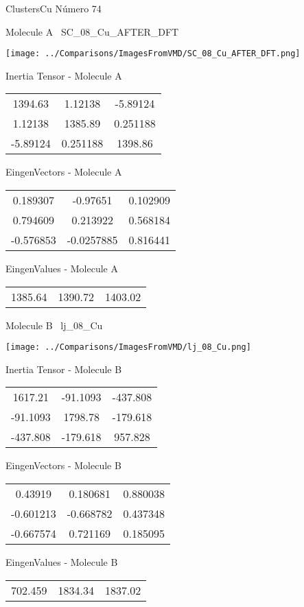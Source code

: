 \vtab[-3cm]
\begin{center}
{\large ClustersCu \tab Número 74}
\end{center}
\begin{multicols}{2}
\begin{center}

Molecule A \
SC\_08\_Cu\_AFTER\_DFT

\texttt{[image: ../Comparisons/ImagesFromVMD/SC\_08\_Cu\_AFTER\_DFT.png]}

Inertia Tensor - Molecule A \\
\begin{tabular}{|c c c|}
1394.63	 & 	1.12138	 & 	-5.89124	 \\
1.12138	 & 	1385.89	 & 	0.251188	 \\
-5.89124	 & 	0.251188	 & 	1398.86
\end{tabular}

\vtab
 EingenVectors - Molecule A     \\
\begin{tabular}{|c c c|}
0.189307	 & 	-0.97651	 & 	0.102909	 \\
0.794609	 & 	0.213922	 & 	0.568184	 \\
-0.576853	 & 	-0.0257885	 & 	0.816441
\end{tabular}

\vtab
 EingenValues - Molecule A     \\
\begin{tabular}{|c c c|}
1385.64	 & 	1390.72	 & 	1403.02	 \\
\end{tabular}
\columnbreak

Molecule B \
lj\_08\_Cu

\texttt{[image: ../Comparisons/ImagesFromVMD/lj\_08\_Cu.png]}

Inertia Tensor - Molecule B \\
\begin{tabular}{|c c c|}
1617.21	 & 	-91.1093	 & 	-437.808	 \\
-91.1093	 & 	1798.78	 & 	-179.618	 \\
-437.808	 & 	-179.618	 & 	957.828
\end{tabular}

\vtab
 EingenVectors - Molecule B     \\
\begin{tabular}{|c c c|}
0.43919	 & 	0.180681	 & 	0.880038	 \\
-0.601213	 & 	-0.668782	 & 	0.437348	 \\
-0.667574	 & 	0.721169	 & 	0.185095
\end{tabular}

\vtab
 EingenValues - Molecule B     \\
\begin{tabular}{|c c c|}
702.459	 & 	1834.34	 & 	1837.02	 \\
\end{tabular}

\end{center}
\end{multicols}

